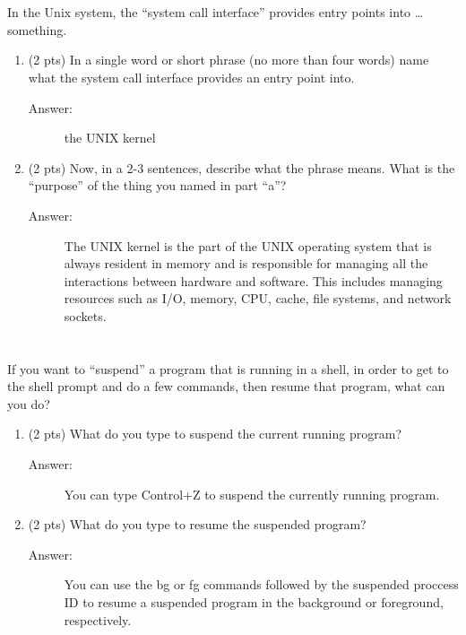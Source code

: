 \documentclass[11pt]{article}
\begin{document}
\section{}
\label{sec:orgc12b0fa}

In the Unix system, the “system call interface” provides entry points
into \ldots{} something.

\begin{enumerate}
\item (2 pts) In a single word or short phrase (no more than four words)
name what the system call interface provides an entry point into.

\begin{description}
    \item[Answer:] the UNIX kernel
\end{description}

\item (2 pts) Now, in a 2-3 sentences, describe what the phrase means. What
is the “purpose” of the thing you named in part “a”?

\begin{description}
    \item[Answer:] The UNIX kernel is the part of the UNIX operating system that is always resident in memory and is responsible for managing all the interactions between hardware and software. This includes managing resources such as I/O, memory, CPU, cache, file systems, and network sockets.
\end{description}
\end{enumerate}

\section{}
\label{sec:org8f24839}

If you want to “suspend” a program that is running in a shell, in order
to get to the shell prompt and do a few commands, then resume that
program, what can you do?

\begin{enumerate}
\item (2 pts) What do you type to suspend the current running program?

\begin{description}
    \item[Answer:] You can type Control+Z to suspend the currently running program.
\end{description}

\item (2 pts) What do you type to resume the suspended program?

\begin{description}
    \item[Answer:] You can use the bg or fg commands followed by the suspended proccess ID to resume a suspended program in the background or foreground, respectively.
\end{description}
\end{enumerate}
\end{document}
